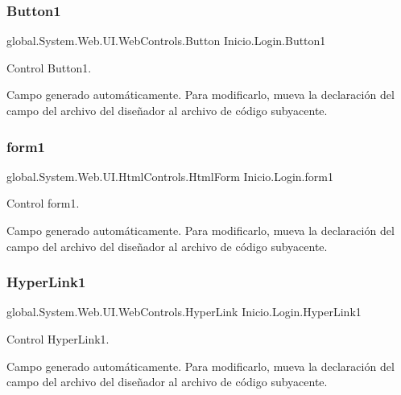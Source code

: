 \subsubsection{\texorpdfstring{Button1}{Button1}}
{\footnotesize\ttfamily global.\+System.\+Web.\+U\+I.\+Web\+Controls.\+Button Inicio.\+Login.\+Button1\hspace{0.3cm}{\ttfamily [protected]}}



Control Button1. 

Campo generado automáticamente. Para modificarlo, mueva la declaración del campo del archivo del diseñador al archivo de código subyacente. \mbox{\label{class_inicio_1_1_login_a52e65c9e6119c96fb9e7efb178a72214}} 
\subsubsection{\texorpdfstring{form1}{form1}}
{\footnotesize\ttfamily global.\+System.\+Web.\+U\+I.\+Html\+Controls.\+Html\+Form Inicio.\+Login.\+form1\hspace{0.3cm}{\ttfamily [protected]}}



Control form1. 

Campo generado automáticamente. Para modificarlo, mueva la declaración del campo del archivo del diseñador al archivo de código subyacente. \mbox{\label{class_inicio_1_1_login_a3370ab8441b3a73d003560dcbcaff0d9}} 
\subsubsection{\texorpdfstring{HyperLink1}{HyperLink1}}
{\footnotesize\ttfamily global.\+System.\+Web.\+U\+I.\+Web\+Controls.\+Hyper\+Link Inicio.\+Login.\+Hyper\+Link1\hspace{0.3cm}{\ttfamily [protected]}}



Control Hyper\+Link1. 

Campo generado automáticamente. Para modificarlo, mueva la declaración del campo del archivo del diseñador al archivo de código subyacente. \mbox{\label{class_inicio_1_1_login_a51395541b60da1b91a7cbbd240b4c0f3}} 
